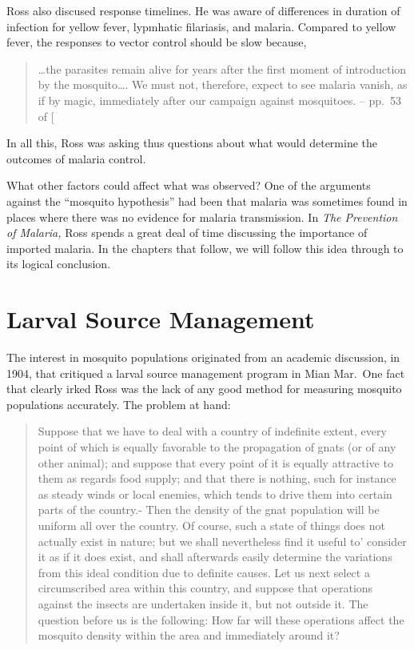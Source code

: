 \documentclass[
]{book}
\begin{document}
Ross also discused response timelines. He was aware of differences in duration of infection for yellow fever, lypmhatic filariasis, and malaria. Compared to yellow fever, the responses to vector control should be slow because,

\begin{quote}
\ldots the parasites remain alive for years after the first moment of introduction by the mosquito\ldots. We must not, therefore, expect to see malaria vanish, as if by magic, immediately after our campaign against mosquitoes. -- pp.~53 of {[}\citeproc{ref-RossR1902MosquitoBrigades}{33}{]}
\end{quote}

In all this, Ross was asking thus questions about what would determine the outcomes of malaria control.

What other factors could affect what was observed? One of the arguments against the ``mosquito hypothesis'' had been that malaria was sometimes found in places where there was no evidence for malaria transmission. In \emph{The Prevention of Malaria,} Ross spends a great deal of time discussing the importance of imported malaria. In the chapters that follow, we will follow this idea through to its logical conclusion.

\section{Larval Source Management}\label{larval-source-management}

The interest in mosquito populations originated from an academic discussion, in 1904, that critiqued a larval source management program in Mian Mar.~One fact that clearly irked Ross was the lack of any good method for measuring mosquito populations accurately. The problem at hand:

\begin{quote}
Suppose that we have to deal with a country of indefinite extent, every point of which is equally favorable to the propagation of gnats (or of any other animal); and suppose that every point of it is equally attractive to them as regards food supply; and that there is nothing, such for instance as steady winds or local enemies, which tends to drive them into certain parts of the country.- Then the density of the gnat population will be uniform all over the country. Of course, such a state of things does not actually exist in nature; but we shall nevertheless find it useful to' consider it as if it does exist, and shall afterwards easily determine the variations from this ideal condition due to definite causes. Let us next select a circumscribed area within this country, and suppose that operations against the insects are undertaken inside it, but not outside it. The question before us is the following: How far will these operations affect the mosquito density within the area and immediately around it?
\end{quote}
\end{document}
